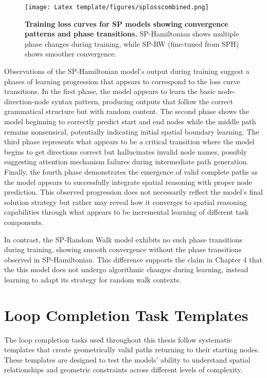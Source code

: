 \begin{figure}[H]
\centering
\texttt{[image: Latex template/figures/splosscombined.png]}
\caption[Training loss curves for SP models]{\textbf{Training loss curves for SP models showing convergence patterns and phase transitions.} SP-Hamiltonian shows multiple phase changes during training, while SP-RW (fine-tuned from SPH) shows smoother convergence.}
\label{fig:training_loss_curves}
\end{figure}

Observations of the SP-Hamiltonian model's output during training suggest a phases of learning progression that appears to correspond to the loss curve transitions. In the first phase, the model appears to learn the basic node-direction-node syntax pattern, producing outputs that follow the correct grammatical structure but with random content. The second phase shows the model beginning to correctly predict start and end nodes while the middle path remains nonsensical, potentially indicating initial spatial boundary learning. The third phase represents what appears to be a critical transition where the model begins to get directions correct but hallucinates invalid node names, possibly suggesting attention mechanism failures during intermediate path generation. Finally, the fourth phase demonstrates the emergence of valid complete paths as the model appears to successfully integrate spatial reasoning with proper node prediction. This observed progression does not necessarily reflect the model's final solution strategy but rather may reveal how it converges to spatial reasoning capabilities through what appears to be incremental learning of different task components.

In contrast, the SP-Random Walk model exhibits no such phase transitions during training, showing smooth convergence without the phase transitions observed in SP-Hamiltonian. This difference supports the claim in Chapter 4 that the this model does not undergo algorithmic changes during learning, instead learning to adapt its strategy for random walk contexts. 

\section{Loop Completion Task Templates}

The loop completion tasks used throughout this thesis follow systematic templates that create geometrically valid paths returning to their starting nodes. These templates are designed to test the models' ability to understand spatial relationships and geometric constraints across different levels of complexity.

